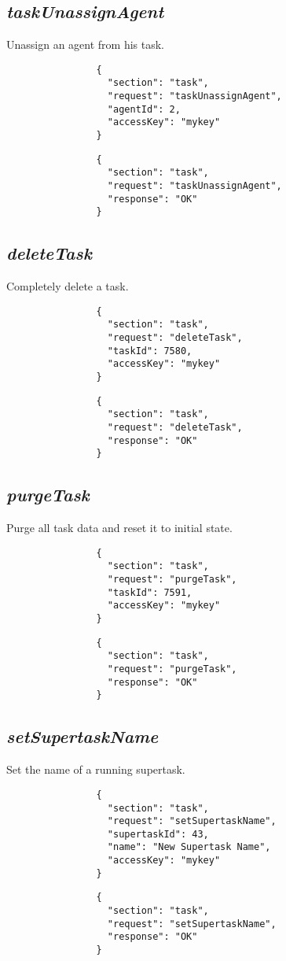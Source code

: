 		\subsection*{\textit{taskUnassignAgent}}
			Unassign an agent from his task.
			{
				\color{blue}
				\begin{verbatim}
				{
				  "section": "task",
				  "request": "taskUnassignAgent",
				  "agentId": 2,
				  "accessKey": "mykey"
				}
				\end{verbatim}
			}
			{
				\color{OliveGreen}
				\begin{verbatim}
				{
				  "section": "task",
				  "request": "taskUnassignAgent",
				  "response": "OK"
				}
				\end{verbatim}
			}
		\subsection*{\textit{deleteTask}}
			Completely delete a task.
			{
				\color{blue}
				\begin{verbatim}
				{
				  "section": "task",
				  "request": "deleteTask",
				  "taskId": 7580,
				  "accessKey": "mykey"
				}
				\end{verbatim}
			}
			{
				\color{OliveGreen}
				\begin{verbatim}
				{
				  "section": "task",
				  "request": "deleteTask",
				  "response": "OK"
				}
				\end{verbatim}
			}		
		\subsection*{\textit{purgeTask}}
			Purge all task data and reset it to initial state.
			{
				\color{blue}
				\begin{verbatim}
				{
				  "section": "task",
				  "request": "purgeTask",
				  "taskId": 7591,
				  "accessKey": "mykey"
				}
				\end{verbatim}
			}
			{
				\color{OliveGreen}
				\begin{verbatim}
				{
				  "section": "task",
				  "request": "purgeTask",
				  "response": "OK"
				}
				\end{verbatim}
			}
		\subsection*{\textit{setSupertaskName}}
			Set the name of a running supertask.
			{
				\color{blue}
				\begin{verbatim}
				{
				  "section": "task",
				  "request": "setSupertaskName",
				  "supertaskId": 43,
				  "name": "New Supertask Name",
				  "accessKey": "mykey"
				}
				\end{verbatim}
			}
			{
				\color{OliveGreen}
				\begin{verbatim}
				{
				  "section": "task",
				  "request": "setSupertaskName",
				  "response": "OK"
				}
				\end{verbatim}
			}
